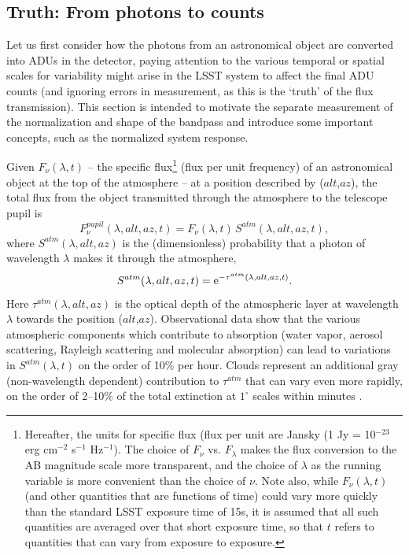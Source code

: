 \documentclass[12pt,preprint]{aastex}
\begin{document}
\subsection{Truth: From photons to counts}

Let us first consider how the photons from an astronomical object are
converted into ADUs in the detector, paying attention to the various
temporal or spatial scales for variability might arise in the LSST
system to affect the final ADU counts (and ignoring errors in
measurement, as this is the `truth' of the flux transmission). This section is intended
to motivate the separate measurement of the normalization and shape of
the bandpass and introduce some important concepts, such as the
normalized system response.

Given $F_\nu(\lambda, t)$ --
the specific flux\footnote{Hereafter, the units for specific
flux (flux per unit  are Jansky (1 Jy = 10$^{-23}$ erg cm$^{-2}$ s$^{-1}$
Hz$^{-1}$). The choice of $F_\nu$ vs. $F_\lambda$ makes the flux
conversion to the AB magnitude scale more transparent, and the choice
of $\lambda$ as the running variable is more convenient than the
choice of $\nu$. Note also, while $F_\nu(\lambda,t)$ (and other
quantities that are functions of time) could vary more quickly than
the standard LSST exposure time of 15s, it is assumed that all such
quantities are averaged over that short exposure time, so that $t$
refers to quantities that can vary from exposure to exposure. }
(flux per unit frequency) of an astronomical object at
the top of the atmosphere -- at a position described by ($alt$,$az$),
the total flux from the object transmitted through the atmosphere to the telescope pupil is
\begin{equation}
\label{eqn:Fpupil}
   F_\nu^{pupil}(\lambda,alt,az,t) = F_\nu(\lambda, t) \, S^{atm}(\lambda,alt,az,t),
\end{equation}
where $S^{atm}(\lambda,alt,az)$ is the (dimensionless) probability that a photon of 
wavelength $\lambda$ makes it through the atmosphere,
\begin{equation}
\label{eqn:atmTau}
   S^{atm}(\lambda,alt,az,t)   = {\rm e}^{-\tau^{atm}(\lambda,alt,az,t)}.
\end{equation}
Here $\tau^{atm}(\lambda,alt,az)$ is the optical depth of the
atmospheric layer at wavelength $\lambda$ towards the position
($alt$,$az$). Observational data \citep{Stubbs2007b, Burke2010b} show
that the various atmospheric components which contribute to absorption
(water vapor, aerosol scattering, Rayleigh scattering and molecular
absorption) can lead to variations in $S^{atm}(\lambda,t)$ on the
order of 10\% per hour. Clouds represent an additional gray (non-wavelength
dependent) contribution to $\tau^{atm}$ that can vary even more
rapidly, on the order of 2--10\% of the total extinction at $1^{\circ}$
scales within minutes \citep{Ivezic2007}.
\end{document}
